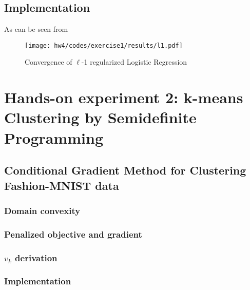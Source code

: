 \documentclass[12pt]{article}
\begin{document}
\subsection{Implementation}
As can be seen from

\begin{figure}[ht]
    \centering
    \texttt{[image: hw4/codes/exercise1/results/l1.pdf]}
    \caption{Convergence of $\ell$-1 regularized Logistic Regression}
    \label{fig:l1-convergence}
\end{figure}

\section{Hands-on experiment 2: k-means Clustering by Semidefinite Programming}

\subsection{Conditional Gradient Method for Clustering Fashion-MNIST data}
\subsubsection{Domain convexity}
\subsubsection{Penalized objective and gradient}
\subsubsection{\texorpdfstring{$v_{k}$}{Lg} derivation}
\subsubsection{Implementation}
\end{document}
